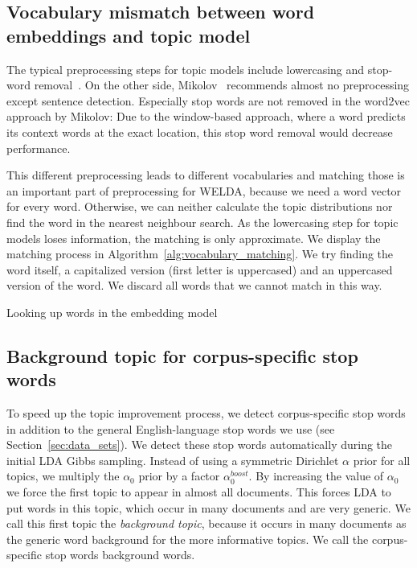 \documentclass[
        a4paper,
        titlepage,
        twoside,
        parskip
        ]{scrbook}
\theoremstyle{break}
\begin{document}
\subsection{Vocabulary mismatch between word embeddings and topic model}
\label{sec:vocabulary_mismatch}
The typical preprocessing steps for topic models include lowercasing and stop-word removal~\cite{Boyd-graber2014}.
On the other side, Mikolov~\cite{Mikolov2013d} recommends almost no preprocessing except sentence detection.
Especially stop words are not removed in the word2vec approach by Mikolov:
Due to the window-based approach, where a word predicts its context words at the exact location, this stop word removal would decrease performance.

This different preprocessing leads to different vocabularies and matching those is an important part of preprocessing for WELDA, because we need a word vector for every word.
Otherwise, we can neither calculate the topic distributions nor find the word in the nearest neighbour search.
As the lowercasing step for topic models loses information, the matching is only approximate.
We display the matching process in Algorithm~\ref{alg:vocabulary_matching}.
We try finding the word itself, a capitalized version (first letter is uppercased) and an uppercased version of the word.
We discard all words that we cannot match in this way.

\begin{algorithm}
  \caption{Looking up words in the embedding model}
  \label{alg:vocabulary_matching}
  \begin{algorithmic}[1]
      \State{}
      \State{}
      \State{}
    \Else
    \EndIf
    \EndProcedure
  \end{algorithmic}
\end{algorithm}

\subsection{Background topic for corpus-specific stop words}
\label{sec:background_topic}
To speed up the topic improvement process, we detect corpus-specific stop words in addition to the general English-language stop words we use (see Section~\ref{sec:data_sets}).
We detect these stop words automatically during the initial LDA Gibbs sampling.
Instead of using a symmetric Dirichlet $\alpha$ prior for all topics, we multiply the $\alpha_0$ prior by a factor $\alpha_0^{boost}$.
By increasing the value of $\alpha_0$ we force the first topic to appear in almost all documents.
This forces LDA to put words in this topic, which occur in many documents and are very generic.
We call this first topic the \emph{background topic}, because it occurs in many documents as the generic word background for the more informative topics.
We call the corpus-specific stop words background words.
\end{document}
